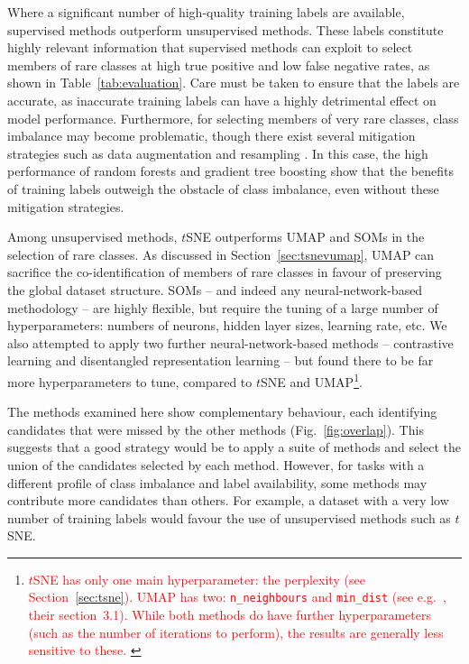 \documentclass[fleqn,usenatbib]{rasti}
\newcommand{\red}[1]{\textcolor{red}{#1}}
\begin{document}
Where a significant number of high-quality training labels are available, supervised methods outperform unsupervised methods.
These labels constitute highly relevant information that supervised methods can exploit to select members of rare classes at high true positive and low false negative rates, as shown in Table~\ref{tab:evaluation}.
Care must be taken to ensure that the labels are accurate, as inaccurate training labels can have a highly detrimental effect on model performance.
Furthermore, for selecting members of very rare classes, class imbalance may become problematic, though there exist several mitigation strategies such as data augmentation and resampling \citep[see also][]{vincent25}.
In this case, the high performance of random forests and gradient tree boosting show that the benefits of training labels outweigh the obstacle of class imbalance, even without these mitigation strategies.

Among unsupervised methods, $t$SNE outperforms UMAP and SOMs in the selection of rare classes.
As discussed in Section~\ref{sec:tsnevumap}, UMAP can sacrifice the co-identification of members of rare classes in favour of preserving the global dataset structure.
SOMs -- and indeed any neural-network-based methodology -- are highly flexible, but require the tuning of a large number of hyperparameters: numbers of neurons, hidden layer sizes, learning rate, etc.
We also attempted to apply two further neural-network-based methods -- contrastive learning \citep{chen20} and disentangled representation learning \citep[e.g.][]{wang24} -- but found there to be far more hyperparameters to tune, compared to $t$SNE and UMAP\footnote{
\red{
    $t$SNE has only one main hyperparameter: the perplexity (see Section~\ref{sec:tsne}).
    UMAP has two: \texttt{n\_neighbours} and \texttt{min\_dist} (see e.g.\ \citet{kao24}, their section~3.1).
    While both methods do have further hyperparameters (such as the number of iterations to perform), the results are generally less sensitive to these.
}
}.

The methods examined here show complementary behaviour, each identifying candidates that were missed by the other methods (Fig.~\ref{fig:overlap}).
This suggests that a good strategy would be to apply a suite of methods and select the union of the candidates selected by each method.
However, for tasks with a different profile of class imbalance and label availability, some methods may contribute more candidates than others.
For example, a dataset with a very low number of training labels would favour the use of unsupervised methods such as $t$SNE.
\end{document}

